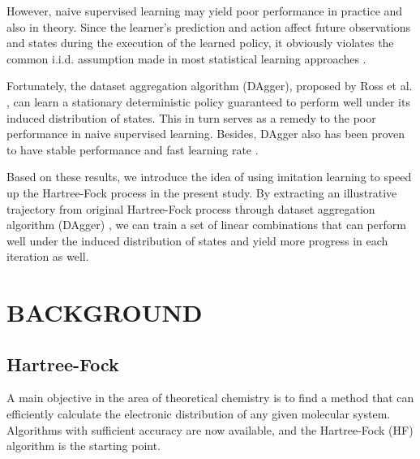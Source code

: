 \documentclass[twoside]{article}
\begin{document}


However, naive supervised learning may yield poor performance in practice and also in theory.  Since the learner's prediction and action affect future observations and states during the execution of the learned policy, it obviously violates the common i.i.d. assumption made in most statistical learning approaches \cite{Ross}.



Fortunately, the dataset aggregation algorithm (DAgger), proposed by Ross et al. \cite{DAgger}, can learn a stationary deterministic policy guaranteed to perform well under its induced distribution of states. This in turn serves as a remedy to the poor performance in naive supervised learning. Besides, DAgger also has been proven to have stable performance and fast learning rate \cite{DAggerCompare}.

Based on these results, we introduce the idea of using imitation learning to speed up the Hartree-Fock process in the present study. By extracting an illustrative trajectory from original Hartree-Fock process
through dataset aggregation algorithm (DAgger) \cite{DAgger}, we can train a set of linear combinations that can perform well under the induced distribution of states and yield more progress in each iteration as well. 


\section{BACKGROUND}

\subsection{Hartree-Fock}



A main objective in the area of theoretical chemistry is to find a method that can efficiently calculate the electronic distribution of any given molecular system. %
Algorithms with sufficient accuracy are now available, and the Hartree-Fock (HF) algorithm is the starting point.
\end{document}
